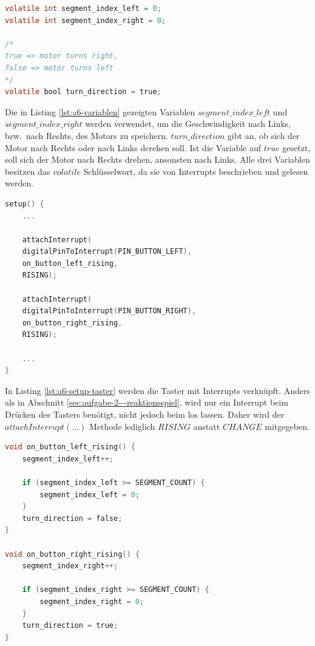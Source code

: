 \begin{lstlisting}[language=C,label={lst:a6-variablen}, caption={Wichtige Variablen}]
volatile int segment_index_left = 0;
volatile int segment_index_right = 0;

/*
true => motor turns right,
false => motor turns left
*/
volatile bool turn_direction = true;
\end{lstlisting}

\newpage

Die in Listing \ref{lst:a6-variablen} gezeigten Variablen $segment\_index\_left$ und $segment\_index\_right$ werden verwendet, um die Geschwindigkeit nach Links, bzw.\ nach Rechts, des Motors zu speichern.
$turn\_direction$ gibt an, ob sich der Motor nach Rechts oder nach Links derehen soll.
Ist die Variable auf $true$ gesetzt, soll sich der Motor nach Rechts drehen, ansonsten nach Links.
Alle drei Variablen besitzen das $volatile$ Schlüsselwort, da sie von Interrupts beschrieben und gelesen werden.

\begin{lstlisting}[language=C,label={lst:a6-setup-taster}, caption={Setup der Taster}]
setup() {
    ...

    attachInterrupt(
    digitalPinToInterrupt(PIN_BUTTON_LEFT),
    on_button_left_rising,
    RISING);

    attachInterrupt(
    digitalPinToInterrupt(PIN_BUTTON_RIGHT),
    on_button_right_rising,
    RISING);

    ...
}
\end{lstlisting}

In Listing \ref{lst:a6-setup-taster} werden die Taster mit Interrupts verknüpft.
Anders als in Abschnitt \ref{sec:aufgabe-2---reaktionsspiel}, wird nur ein Interrupt beim Drücken des Tasters benötigt, nicht jedoch beim los lassen.
Daher wird der $attachInterrupt(\dots)$ Methode lediglich $RISING$ anstatt $CHANGE$ mitgegeben.

\newpage

\begin{lstlisting}[language=C,label={lst:a6-interrupts}, caption={Interrupts der Taster}]
void on_button_left_rising() {
    segment_index_left++;

    if (segment_index_left >= SEGMENT_COUNT) {
        segment_index_left = 0;
    }
    turn_direction = false;
}

void on_button_right_rising() {
    segment_index_right++;

    if (segment_index_right >= SEGMENT_COUNT) {
        segment_index_right = 0;
    }
    turn_direction = true;
}
\end{lstlisting}

